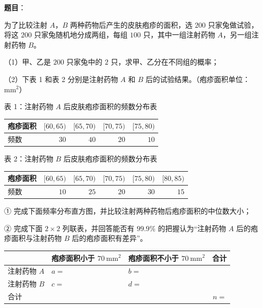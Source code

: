\begin{answer}

\textbf{题目}：

为了比较注射 $A$，$B$ 两种药物后产生的皮肤疱疹的面积，选 $200$ 只家兔做试验，将这 $200$ 只家兔随机地分成两组，每组 $100$ 只，其中一组注射药物 $A$，另一组注射药物 $B$。

（1）甲、乙是 $200$ 只家兔中的 $2$ 只，求甲、乙分在不同组的概率；

（2）下表 1 和表 2 分别是注射药物 $A$ 和 $B$ 后的试验结果。（疱疹面积单位：$\mathrm{mm}^2$）

表 1：注射药物 $A$ 后皮肤疱疹面积的频数分布表

\begin{center}
\begin{tabular}{lrrrr}
\toprule
疱疹面积 & $[60,65)$ & $[65,70)$ & $[70,75)$ & $[75,80)$ \\
\midrule
频数 & $30$ & $40$ & $20$ & $10$ \\
\bottomrule
\end{tabular}
\end{center}

表 2：注射药物 $B$ 后皮肤疱疹面积的频数分布表

\begin{center}
\begin{tabular}{lrrrrr}
\toprule
疱疹面积 & $[60,65)$ & $[65,70)$ & $[70,75)$ & $[75,80)$ & $[80,85)$ \\
\midrule
频数 & $10$ & $25$ & $20$ & $30$ & $15$ \\
\bottomrule
\end{tabular}
\end{center}

① 完成下面频率分布直方图，并比较注射两种药物后疱疹面积的中位数大小；
\nopagebreak[4]
\begin{center}\end{center}
\nopagebreak[4]
② 完成下面 $2\times2$ 列联表，并回答能否有 $99.9\%$ 的把握认为“注射药物 $A$ 后的疱疹面积与注射药物 $B$ 后的疱疹面积有差异”。

\begin{center}
\begin{tabular}{lllr}
\toprule
 & 疱疹面积小于 $70\ \mathrm{mm}^2$ & 疱疹面积不小于 $70\ \mathrm{mm}^2$ & 合计 \\
\midrule
注射药物 $A$ & $a=$ & $b=$ &  \\
注射药物 $B$ & $c=$ & $d=$ &  \\
合计 &  &  & $n=$ \\
\bottomrule
\end{tabular}
\end{center}


\end{answer}
